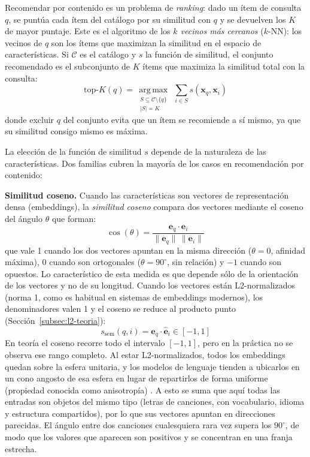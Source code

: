Recomendar por contenido es un problema de \textit{ranking}: dado un ítem de consulta $q$, se puntúa cada ítem del catálogo por su similitud con $q$ y se devuelven los $K$ de mayor puntaje. Este es el algoritmo de los \textit{$k$ vecinos más cercanos} ($k$-NN): los vecinos de $q$ son los ítems que maximizan la similitud en el espacio de características. Si $\mathcal{C}$ es el catálogo y $s$ la función de similitud, el conjunto recomendado es el subconjunto de $K$ ítems que maximiza la similitud total con la consulta:
\begin{equation}
    \text{top-}K(q) = \operatorname*{arg\,max}_{\substack{S \subseteq \mathcal{C} \setminus \{q\} \\ |S| = K}} \; \sum_{i \in S} s(\mathbf{x}_q, \mathbf{x}_i)
    \label{eq:topk-knn}
\end{equation}
\noindent donde excluir $q$ del conjunto evita que un ítem se recomiende a sí mismo, ya que su similitud consigo mismo es máxima.

La elección de la función de similitud $s$ depende de la naturaleza de las características. Dos familias cubren la mayoría de los casos en recomendación por contenido:

\textbf{Similitud coseno.} Cuando las características son vectores de representación densa (embeddings), la \textit{similitud coseno} compara dos vectores mediante el coseno del ángulo $\theta$ que forman:
\begin{equation*}
    \cos(\theta) = \frac{\mathbf{e}_q \cdot \mathbf{e}_i}{\|\mathbf{e}_q\|\,\|\mathbf{e}_i\|}
\end{equation*}
\noindent que vale 1 cuando los dos vectores apuntan en la misma dirección ($\theta = 0$, afinidad máxima), 0 cuando son ortogonales ($\theta = 90^\circ$, sin relación) y $-1$ cuando son opuestos. Lo característico de esta medida es que depende sólo de la orientación de los vectores y no de su longitud. Cuando los vectores están L2-normalizados (norma 1, como es habitual en sistemas de embeddings modernos), los denominadores valen 1 y el coseno se reduce al producto punto (Sección~\ref{subsec:l2-teoria}):
\begin{equation*}
    s_{\text{sem}}(q, i) = \hat{\mathbf{e}}_q \cdot \hat{\mathbf{e}}_i \in [-1, 1]
\end{equation*}
\noindent En teoría el coseno recorre todo el intervalo $[-1, 1]$, pero en la práctica no se observa ese rango completo. Al estar L2-normalizados, todos los embeddings quedan sobre la esfera unitaria, y los modelos de lenguaje tienden a ubicarlos en un cono angosto de esa esfera en lugar de repartirlos de forma uniforme (propiedad conocida como anisotropía) \parencite{ethayarajh_2019_contextual, gao_2019_representation}. A esto se suma que aquí todas las entradas son objetos del mismo tipo (letras de canciones, con vocabulario, idioma y estructura compartidos), por lo que sus vectores apuntan en direcciones parecidas. El ángulo entre dos canciones cualesquiera rara vez supera los $90^\circ$, de modo que los valores que aparecen son positivos y se concentran en una franja estrecha.

